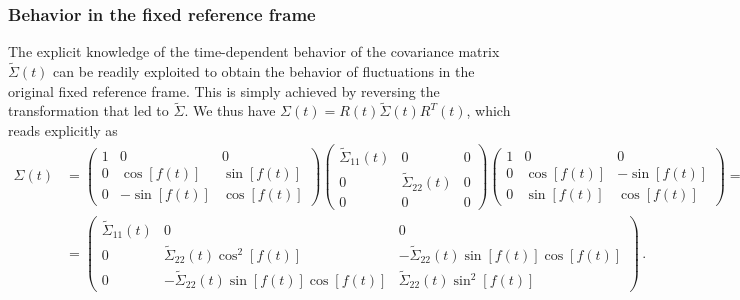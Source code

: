 \documentclass[prl,superscriptaddress,showpacs,longbibliography,reprint]{revtex4-2}
\begin{document}
\subsubsection{Behavior in the fixed reference frame}
The explicit knowledge of the time-dependent behavior of the covariance matrix $\tilde{\Sigma}(t)$ can be readily exploited to obtain the behavior of fluctuations in the original fixed reference frame. This is simply achieved by reversing the transformation that led to $\tilde{\Sigma}$. We thus have $\Sigma(t)=R(t)\tilde{\Sigma}(t)R^T(t)$, which reads explicitly as
\begin{equation}
\begin{split}
    \Sigma(t)&=\begin{pmatrix}
    1&0&0\\
    0&\cos[f(t)]&\sin[f(t)]\\
    0&-\sin[f(t)]&\cos[f(t)]
    \end{pmatrix} \begin{pmatrix}
    \tilde{\Sigma}_{11}(t)&0&0\\
    0&\tilde{\Sigma}_{22}(t)&0\\
    0&0&0
    \end{pmatrix} \begin{pmatrix}
    1&0&0\\
    0&\cos[f(t)]&-\sin[f(t)]\\
    0&\sin[f(t)]&\cos[f(t)]
    \end{pmatrix}=\\
    &=\begin{pmatrix}
    \tilde{\Sigma}_{11}(t)&0&0\\
    0&\tilde{\Sigma}_{22}(t)\cos^2[f(t)]&-\tilde{\Sigma}_{22}(t)\sin[f(t)]\cos[f(t)]\\
    0&-\tilde{\Sigma}_{22}(t)\sin[f(t)]\cos[f(t)]&\tilde{\Sigma}_{22}(t)\sin^2[f(t)]
    \end{pmatrix}\, .
    \end{split}
\end{equation}
\end{document}
